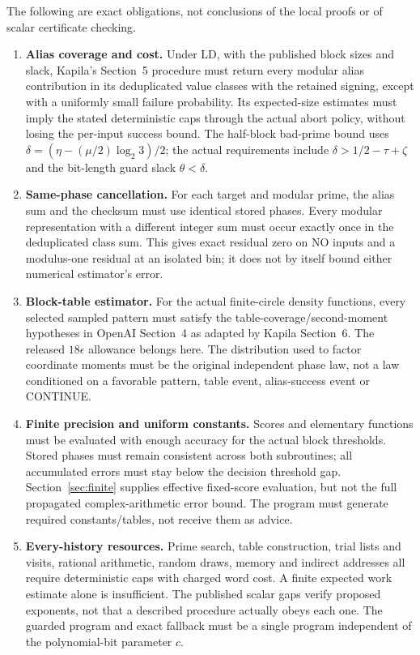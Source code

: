 The following are exact obligations, not conclusions of the local
proofs or of scalar certificate checking.
\begin{enumerate}
\item \textbf{Alias coverage and cost.} Under LD, with the published
block sizes and slack, Kapila's Section~5 procedure must return every
modular alias contribution in its deduplicated value classes with the
retained signing, except with a uniformly small failure probability.
Its expected-size estimates must imply the stated deterministic caps
through the actual abort policy, without losing the per-input success
bound. The half-block bad-prime bound uses
$\delta=(\eta-(\mu/2)\log_2 3)/2$; the actual requirements include
$\delta>1/2-\tau+\zeta$ and the bit-length guard slack $\theta<\delta$.
\item \textbf{Same-phase cancellation.} For each target and modular
prime, the alias sum and the checksum must use identical stored phases.
Every modular representation with a different integer sum must occur
exactly once in the deduplicated class sum. This gives exact residual
zero on NO inputs and a modulus-one residual at an isolated bin;
it does not by itself bound either numerical estimator's error.
\item \textbf{Block-table estimator.} For the actual finite-circle
density functions, every selected sampled pattern must satisfy the
table-coverage/second-moment hypotheses in OpenAI Section~4 as adapted
by Kapila Section~6. The released $18\epsilon$ allowance belongs here.
The distribution used to factor coordinate moments must be the original
independent phase law, not a law conditioned on a favorable pattern,
table event, alias-success event or CONTINUE.
\item \textbf{Finite precision and uniform constants.} Scores and
elementary functions must be evaluated with enough accuracy for the
actual block thresholds. Stored phases must remain consistent across
both subroutines; all accumulated errors must stay below the decision
threshold gap. Section~\ref{sec:finite} supplies effective fixed-score
evaluation, but not the full propagated complex-arithmetic error bound.
The program must generate required constants/tables, not receive them
as advice.
\item \textbf{Every-history resources.} Prime search, table construction,
trial lists and visits, rational arithmetic, random draws, memory and
indirect addresses all require deterministic caps with charged word
cost. A finite expected work estimate alone is insufficient. The
published scalar gaps verify proposed exponents, not that a described
procedure actually obeys each one. The guarded program and exact
fallback must be a single program independent of the polynomial-bit
parameter $c$.
\end{enumerate}

